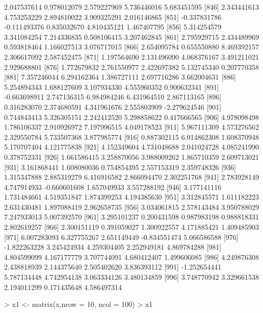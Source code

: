 \documentclass[12pt]{article}
\begin{document}
\begin{Schunk}
\begin{Soutput}
 [841]  2.047537614  0.978012079  2.579227969  5.736446016  5.683451595
 [846]  2.343441613  4.753253229  2.894810022  3.909325291  2.016146865
 [851] -0.337831786 -0.111493376  0.835032670  4.810435121  1.467407795
 [856]  5.314254579  3.341084254  7.214336835  0.508106415  3.207462845
 [861]  2.795929715  2.434489969  0.593818464  1.166027513  3.076717015
 [866]  2.654095784  0.655550880  8.469392157  2.306617092  2.587452475
 [871]  1.197564690  2.131496090  4.068376167  3.491211021  2.929688801
 [876]  1.772679832  2.761550977  2.422697382  5.132745340  0.207770358
 [881]  7.357246044  6.294162364  1.386727111  2.697716286  3.662004631
 [886]  5.254894343  1.688127609  3.107934330  4.555960352  0.900632341
 [891] -0.663698911  2.747136315  6.984984246  6.431964510  2.867113165
 [896]  0.316283070  2.374680591  4.341961676  2.555803909 -2.279624546
 [901]  0.744843413  5.326305151  2.242412520  5.298858622  0.417666565
 [906]  4.978098498  1.786106337  2.910926972  7.197996515  4.049178523
 [911]  5.967111309  4.573276562  2.329550784  5.733507368  3.877985774
 [916]  0.887302115  6.014862308  1.608370948  5.170707404  4.121775838
 [921]  4.152349604  4.731048688  2.041024728  4.085241990  0.378752331
 [926]  1.661586415  3.258870056  3.988009262  1.865710359  2.609713021
 [931]  3.161868441  1.608080036  0.754854395  2.557153319  2.359748326
 [936]  1.315347888  2.885319279  6.416916582  2.866094470  2.302251768
 [941]  2.783928149  4.747914933 -0.660601608  1.657049933  3.557288192
 [946]  3.177141116  1.731484661  4.519351847  1.874399253  4.194385630
 [951]  3.312845571  1.611182223  2.631430481  1.897088419  2.962658735
 [956]  3.034061815  2.578143484  3.950788029  7.247933013  5.007392570
 [961]  3.295101237  0.200431598  0.987983198  0.988818331  2.802619257
 [966]  2.300151119  0.391059027  1.300922557  4.171885421  1.409485903
 [971]  6.007283093  6.327755267  2.651149449 -0.834551474  5.066586588
 [976] -1.822263228  3.245424934  4.259304405  2.252949181  4.869784288
 [981]  4.804599099  4.167177779  3.707744091  4.680412407  1.499606085
 [986]  4.249876308  2.438818939  2.144375640  2.505402620  3.836393112
 [991] -1.252654441  5.787134448  4.742954138  3.063334126  3.480134859
 [996]  3.748770942  3.329661538  2.194011299  0.171435648  4.586497314
\end{Soutput}
\begin{Sinput}
> x1 <- matrix(x,nrow = 10, ncol = 100) 
> x1
\end{Sinput}
\begin{Soutput}
          [,1]      [,2]       [,3]     [,4]         [,5]      [,6]       [,7]

\end{Soutput}
\end{Schunk}
\end{document}
